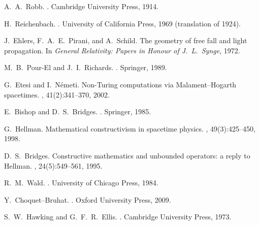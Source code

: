 \documentclass[11pt]{article}
\theoremstyle{definition}
\theoremstyle{remark}
\begin{document}
\begin{thebibliography}{99}
A.~A.~Robb.
.
\newblock Cambridge University Press, 1914.

H.~Reichenbach.
.
\newblock University of California Press, 1969 (translation of 1924).

J.~Ehlers, F.~A.~E.~Pirani, and A.~Schild.
\newblock The geometry of free fall and light propagation.
\newblock In {\em General Relativity: Papers in Honour of J.~L.~Synge}, 1972.

M.~B.~Pour-El and J.~I.~Richards.
.
\newblock Springer, 1989.

G.~Etesi and I.~N{\'e}meti.
\newblock Non-Turing computations via Malament--Hogarth spacetimes.
, 41(2):341--370, 2002.

E.~Bishop and D.~S.~Bridges.
.
\newblock Springer, 1985.

G.~Hellman.
\newblock Mathematical constructivism in spacetime physics.
, 49(3):425--450, 1998.

D.~S.~Bridges.
\newblock Constructive mathematics and unbounded operators: a reply to Hellman.
, 24(5):549--561, 1995.

R.~M.~Wald.
.
\newblock University of Chicago Press, 1984.

Y.~Choquet--Bruhat.
.
\newblock Oxford University Press, 2009.

S.~W.~Hawking and G.~F.~R.~Ellis.
.
\newblock Cambridge University Press, 1973.

\end{thebibliography}
\end{document}

